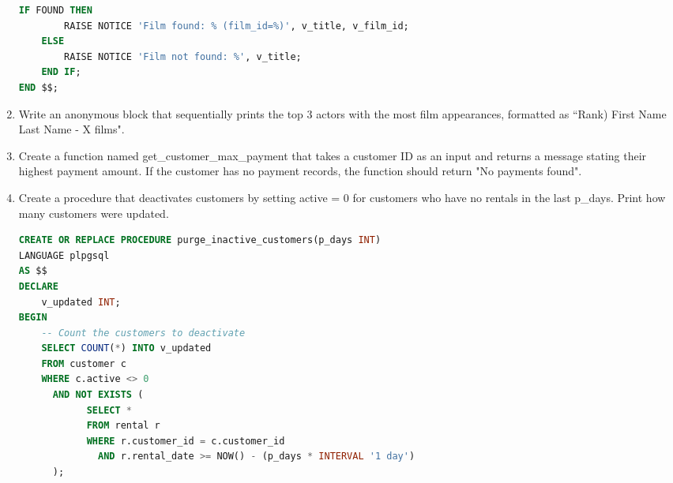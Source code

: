 \documentclass[12pt,a4paper]{article}
\newif\ifshowsolutions
\begin{document}
\begin{enumerate}
\begin{lstlisting}[language=SQL]
    IF FOUND THEN
        RAISE NOTICE 'Film found: % (film_id=%)', v_title, v_film_id;
    ELSE
        RAISE NOTICE 'Film not found: %', v_title;
    END IF;
END $$;
\end{lstlisting}
\fi
\item Write an anonymous block that sequentially prints the top 3 actors with the most film appearances, formatted as ``Rank) First Name Last Name - X films".
\ifshowsolutions
\begin{lstlisting}[language=SQL]
DO $$
DECLARE
    rec RECORD;
    i INT := 0;
BEGIN
    FOR rec IN
        SELECT a.actor_id, a.first_name, a.last_name, COUNT(*) AS film_count
        FROM actor a
        JOIN film_actor fa ON fa.actor_id = a.actor_id
        GROUP BY a.actor_id, a.first_name, a.last_name
        ORDER BY film_count DESC, a.actor_id
        LIMIT 3
    LOOP
        i := i + 1;
        RAISE NOTICE '%) % % - % films', i, rec.first_name, rec.last_name, rec.film_count;
    END LOOP;
END $$;
\end{lstlisting}
\fi
\item Create a function named get\_customer\_max\_payment that takes a customer ID as an input and returns a message stating their highest payment amount. If the customer has no payment records, the function should return "No payments found".
\ifshowsolutions
\begin{lstlisting}[language=SQL]
CREATE OR REPLACE FUNCTION get_customer_max_payment(p_customer_id INT)
RETURNS TEXT
LANGUAGE plpgsql
AS $$
DECLARE
    v_max NUMERIC;
BEGIN
    SELECT MAX(amount)
    INTO v_max
    FROM payment
    WHERE customer_id = p_customer_id;

    IF v_max IS NULL THEN
        RETURN 'No payments found for customer ' || p_customer_id;
    ELSE
        RETURN 'Max payment for customer ' || p_customer_id || ' = ' || v_max;
    END IF;
END;
$$;

select * from get_customer_max_payment(1);
\end{lstlisting}
\fi
\item Create a procedure that deactivates customers by setting active = 0 for customers who have no rentals in the last p\_days. Print how many customers were updated.
\ifshowsolutions
\begin{lstlisting}[language=SQL]
CREATE OR REPLACE PROCEDURE purge_inactive_customers(p_days INT)
LANGUAGE plpgsql
AS $$
DECLARE
    v_updated INT;
BEGIN
    -- Count the customers to deactivate
    SELECT COUNT(*) INTO v_updated
    FROM customer c
    WHERE c.active <> 0
      AND NOT EXISTS (
            SELECT *
            FROM rental r
            WHERE r.customer_id = c.customer_id
              AND r.rental_date >= NOW() - (p_days * INTERVAL '1 day')
      );


\end{lstlisting}
\end{enumerate}
\end{document}
